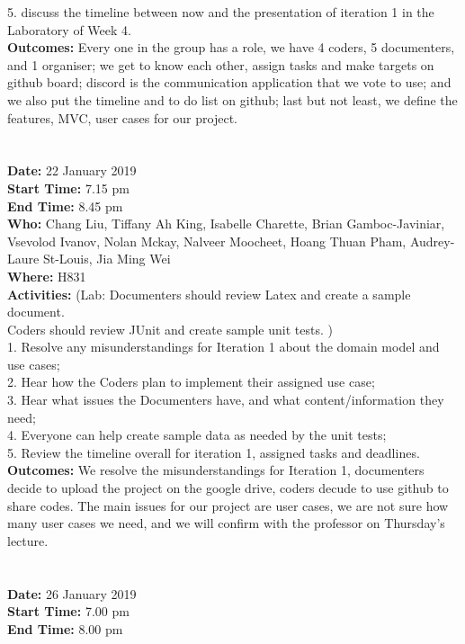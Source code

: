 \documentclass[12pt]{article}
\begin{document}
5. discuss the timeline between now and the presentation of iteration 1 in the Laboratory of
Week 4.\\
{\bf Outcomes:} Every one in the group has a role, we have 4 coders, 5 documenters, and 1 organiser; we get to know each other, assign tasks and make targets on github board; discord is the communication application that we vote to use; and we also put the timeline and to do list on github; last but not least, we define the features, MVC, user cases for our project.\\\\\\
{\bf Date:} 22 January 2019\\
{\bf Start Time:} 7.15 pm\\
{\bf End Time:} 8.45 pm \\
{\bf Who:} Chang Liu, Tiffany Ah King, Isabelle Charette, Brian Gamboc-Javiniar, Vsevolod Ivanov, Nolan Mckay, Nalveer Moocheet, Hoang Thuan Pham, Audrey-Laure St-Louis, Jia Ming Wei\\
{\bf Where:} H831 \\
{\bf Activities:} (Lab: Documenters should review Latex and create a sample document.\\
Coders should review JUnit and create sample unit tests. )\\
1. Resolve any misunderstandings for Iteration 1 about the domain model and use cases;\\
2. Hear how the Coders plan to implement their assigned use case;\\
3. Hear what issues the Documenters have, and what content/information they need; \\
4. Everyone can help create sample data as needed by the unit tests; \\
5. Review the timeline overall for iteration 1, assigned tasks and deadlines.\\
{\bf Outcomes:} We resolve the misunderstandings for Iteration 1, documenters decide to upload the project on the google drive, coders decude to use github to share codes. The main issues for our project are user cases, we are not sure how many user cases we need, and we will confirm with the professor on Thursday's lecture.\\\\\\
{\bf Date:} 26 January 2019\\
{\bf Start Time:} 7.00 pm\\
{\bf End Time:} 8.00 pm \\
\end{document}
